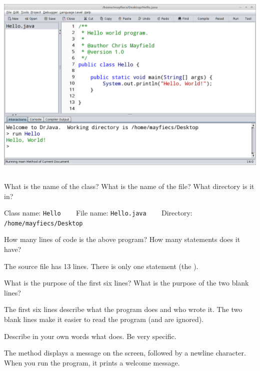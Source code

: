 
\begin{center}
\includegraphics[height=3.65in]{drjava2.png}
\end{center}




\Q What is the name of the class?
What is the name of the file?
What directory is it in?

\begin{answer}
Class name: \texttt{Hello} ~~~
File name: \texttt{Hello.java} ~~~
Directory: \texttt{/home/mayfiecs/Desktop}
\end{answer}


\Q How many lines of code is the above program?
How many statements does it have?

\begin{answer}
The source file has 13 lines.
There is only one statement (the ).
\end{answer}


\Q \label{javadoc}
What is the purpose of the first six lines?
What is the purpose of the two blank lines?

\begin{answer}
The first six lines describe what the program does and who wrote it.
The two blank lines make it easier to read the program (and are ignored).
\end{answer}


\Q \label{println}
Describe in your own words what  does.
Be very specific.

\begin{answer}
The  method displays a message on the screen, followed by a newline character.
When you run the  program, it prints a welcome message.
\end{answer}
